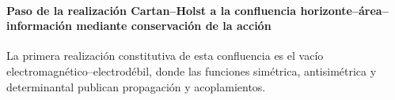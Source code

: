 \paragraph{Paso de la realización Cartan–Holst a la confluencia horizonte–área–información mediante conservación de la acción} La primera realización constitutiva de esta confluencia es el vacío electromagnético--electrodébil, donde las funciones simétrica, antisimétrica y determinantal publican propagación y acoplamientos.
